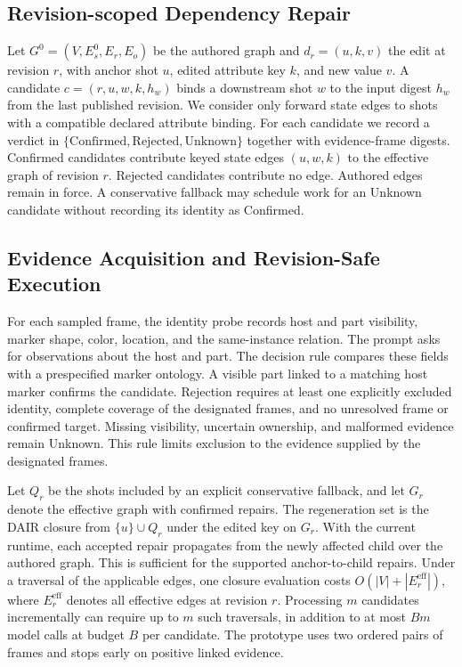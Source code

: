 \subsection{Revision-scoped Dependency Repair}
Let \(G^0=(V,E_s^0,E_r,E_o)\) be the authored graph and
\(d_r=(u,k,v)\) the edit at revision \(r\), with anchor shot \(u\),
edited attribute key \(k\), and new value \(v\). A candidate
\(c=(r,u,w,k,h_w)\) binds a downstream shot \(w\) to the input digest
\(h_w\) from the last published revision. We consider only forward
state edges to shots with a compatible declared attribute binding.
For each candidate we record a verdict in
\(\{\mathrm{Confirmed},\mathrm{Rejected},\mathrm{Unknown}\}\)
together with evidence-frame digests. Confirmed candidates contribute
keyed state edges \((u,w,k)\) to the effective graph of revision \(r\).
Rejected candidates contribute no edge. Authored edges remain in force.
A conservative fallback may schedule work for an Unknown candidate
without recording its identity as Confirmed.

\subsection{Evidence Acquisition and Revision-Safe Execution}
For each sampled frame, the identity probe records host and part visibility,
marker shape, color, location, and the same-instance relation. The prompt
asks for observations about the host and part. The decision rule compares
these fields with a prespecified marker ontology. A visible part linked to
a matching host marker confirms the candidate. Rejection requires at least
one explicitly excluded identity, complete coverage of the designated
frames, and no unresolved frame or confirmed target. Missing visibility,
uncertain ownership, and malformed evidence remain Unknown. This rule
limits exclusion to the evidence supplied by the designated frames.

Let \(Q_r\) be the shots included by an explicit conservative fallback,
and let \(G_r\) denote the effective graph with confirmed repairs.
The regeneration set is the DAIR closure from
\(\{u\}\cup Q_r\) under the edited key on \(G_r\). With the current
runtime, each accepted repair propagates from the newly affected child
over the authored graph. This is sufficient for the supported
anchor-to-child repairs. Under a traversal of the applicable edges, one
closure evaluation costs \(O(|V|+|E_r^{\mathrm{eff}}|)\), where
\(E_r^{\mathrm{eff}}\) denotes all effective edges at revision \(r\).
Processing \(m\) candidates incrementally can require up to \(m\)
such traversals, in addition to at most \(Bm\) model calls at budget
\(B\) per candidate. The prototype uses two ordered pairs of frames
and stops early on positive linked evidence.

